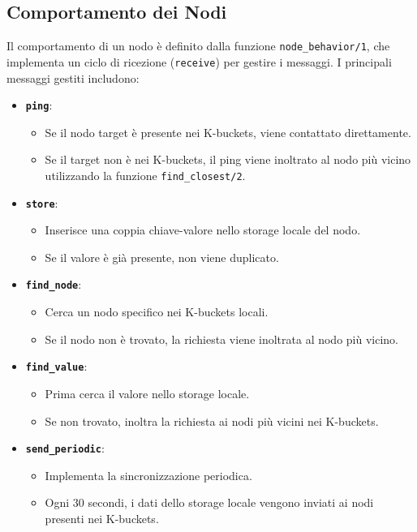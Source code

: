 \documentclass{article}
\begin{document}
\subsection{Comportamento dei Nodi}
Il comportamento di un nodo è definito dalla funzione \texttt{node\_behavior/1}, che implementa un ciclo di ricezione (\texttt{receive}) per gestire i messaggi. I principali messaggi gestiti includono:
\begin{itemize}
    \item \textbf{\texttt{ping}}:
    \begin{itemize}
        \item Se il nodo target è presente nei K-buckets, viene contattato direttamente.
        \item Se il target non è nei K-buckets, il ping viene inoltrato al nodo più vicino utilizzando la funzione \texttt{find\_closest/2}.
    \end{itemize}
    \item \textbf{\texttt{store}}:
    \begin{itemize}
        \item Inserisce una coppia chiave-valore nello storage locale del nodo.
        \item Se il valore è già presente, non viene duplicato.
    \end{itemize}
    \item \textbf{\texttt{find\_node}}:
    \begin{itemize}
        \item Cerca un nodo specifico nei K-buckets locali.
        \item Se il nodo non è trovato, la richiesta viene inoltrata al nodo più vicino.
    \end{itemize}
    \item \textbf{\texttt{find\_value}}:
    \begin{itemize}
        \item Prima cerca il valore nello storage locale.
        \item Se non trovato, inoltra la richiesta ai nodi più vicini nei K-buckets.
    \end{itemize}
    \item \textbf{\texttt{send\_periodic}}:
    \begin{itemize}
        \item Implementa la sincronizzazione periodica.
        \item Ogni 30 secondi, i dati dello storage locale vengono inviati ai nodi presenti nei K-buckets.
    \end{itemize}
\end{itemize}
\end{document}

